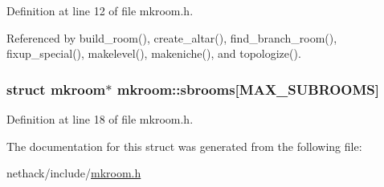 Definition at line 12 of file mkroom.\+h.



Referenced by build\+\_\+room(), create\+\_\+altar(), find\+\_\+branch\+\_\+room(), fixup\+\_\+special(), makelevel(), makeniche(), and topologize().

\hypertarget{structmkroom_ae0365d286660d2b39729c3e7a2c4dc66}{
\subsubsection[{sbrooms}]{\setlength{\rightskip}{0pt plus 5cm}struct {\bf mkroom}$\ast$ mkroom\+::sbrooms\mbox{[}{\bf M\+A\+X\+\_\+\+S\+U\+B\+R\+O\+O\+M\+S}\mbox{]}}}\label{structmkroom_ae0365d286660d2b39729c3e7a2c4dc66}


Definition at line 18 of file mkroom.\+h.



The documentation for this struct was generated from the following file\+:\begin{DoxyCompactItemize}
\item 
nethack/include/\hyperlink{mkroom_8h}{mkroom.\+h}\end{DoxyCompactItemize}
